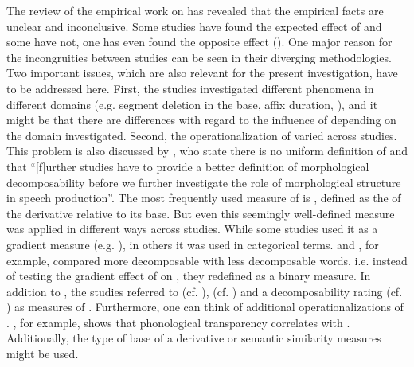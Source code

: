{{%
The review of the empirical work on  has revealed that the empirical facts are unclear and inconclusive. Some studies have found the expected effect of  and some have not, one has even found the opposite effect (\citealt{Schuppler.2012}). 
One major reason for the incongruities between studies can be seen in their diverging methodologies. Two important issues, which are also relevant for the present investigation, have to be addressed  here. 
First, the studies investigated different phenomena in different domains (e.g. segment deletion in the base, affix duration, ), and it might be that there are differences with regard to the influence of  depending on the domain investigated. 
Second, the operationalization of  varied across studies. This problem is also discussed by \citet[16]{Hanique.2012}, who state there is no uniform definition of  and that ``[f]urther studies have to provide a better definition of morphological decomposability before we further investigate the role of morphological structure in speech production''. 
The most frequently used measure of  is , defined as the  of the derivative relative to its base. But even this seemingly well-defined measure was applied in different ways across studies. While some studies used it as a gradient measure (e.g. \citealt{Hanique.2011,Schuppler.2012}), in others it was used in categorical terms. \cite{Hay.2001} and \cite{Collie.2008}, for example, compared more decomposable with less decomposable words, i.e. instead of testing the gradient effect of  on , they redefined  as a binary measure. In addition to ,  the studies referred to  (cf. \citealt{Schuppler.2012}),  (cf. \citealt{Hay.2007}) and a decomposability rating (cf. \citealt{Burki.2011}) as measures of . Furthermore, one can think of additional operationalizations of . \cite{Hay.2003}, for example, shows that phonological transparency correlates with . Additionally, the type of base of a derivative or semantic similarity measures might be used.  

}}

